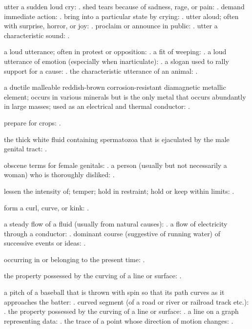   utter a sudden loud cry: . shed tears because of sadness, rage, or pain: . demand immediate action: . bring into a particular state by crying: . utter aloud; often with surprise, horror, or joy: . proclaim or announce in public: . utter a characteristic sound: .

  a loud utterance; often in protest or opposition: . a fit of weeping: . a loud utterance of emotion (especially when inarticulate): . a slogan used to rally support for a cause: . the characteristic utterance of an animal: .

  a ductile malleable reddish-brown corrosion-resistant diamagnetic metallic element; occurs in various minerals but is the only metal that occurs abundantly in large masses; used as an electrical and thermal conductor: .

  prepare for crops: .

  the thick white fluid containing spermatozoa that is ejaculated by the male genital tract: .

  obscene terms for female genitals: . a person (usually but not necessarily a woman) who is thoroughly disliked: .

  lessen the intensity of; temper; hold in restraint; hold or keep within limits: .

  form a curl, curve, or kink: .

  a steady flow of a fluid (usually from natural causes): . a flow of electricity through a conductor: . dominant course (suggestive of running water) of successive events or ideas: .

  occurring in or belonging to the present time: .

  the property possessed by the curving of a line or surface: .

  a pitch of a baseball that is thrown with spin so that its path curves as it approaches the batter: . curved segment (of a road or river or railroad track etc.): . the property possessed by the curving of a line or surface: . a line on a graph representing data: . the trace of a point whose direction of motion changes: .

